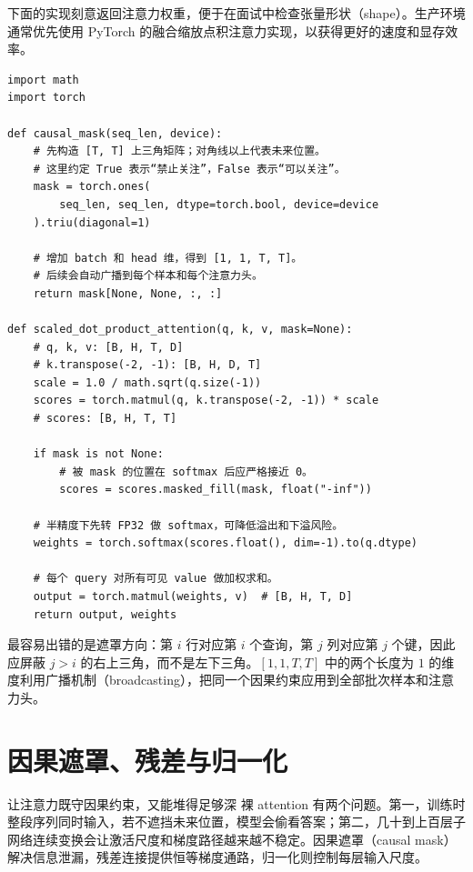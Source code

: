 
下面的实现刻意返回注意力权重，便于在面试中检查张量形状（shape）。生产环境通常优先使用 PyTorch 的融合缩放点积注意力实现，以获得更好的速度和显存效率。

\begin{lstlisting}
import math
import torch

def causal_mask(seq_len, device):
    # 先构造 [T, T] 上三角矩阵；对角线以上代表未来位置。
    # 这里约定 True 表示“禁止关注”，False 表示“可以关注”。
    mask = torch.ones(
        seq_len, seq_len, dtype=torch.bool, device=device
    ).triu(diagonal=1)

    # 增加 batch 和 head 维，得到 [1, 1, T, T]。
    # 后续会自动广播到每个样本和每个注意力头。
    return mask[None, None, :, :]

def scaled_dot_product_attention(q, k, v, mask=None):
    # q, k, v: [B, H, T, D]
    # k.transpose(-2, -1): [B, H, D, T]
    scale = 1.0 / math.sqrt(q.size(-1))
    scores = torch.matmul(q, k.transpose(-2, -1)) * scale
    # scores: [B, H, T, T]

    if mask is not None:
        # 被 mask 的位置在 softmax 后应严格接近 0。
        scores = scores.masked_fill(mask, float("-inf"))

    # 半精度下先转 FP32 做 softmax，可降低溢出和下溢风险。
    weights = torch.softmax(scores.float(), dim=-1).to(q.dtype)

    # 每个 query 对所有可见 value 做加权求和。
    output = torch.matmul(weights, v)  # [B, H, T, D]
    return output, weights
\end{lstlisting}

最容易出错的是遮罩方向：第 $i$ 行对应第 $i$ 个查询，第 $j$ 列对应第 $j$ 个键，因此应屏蔽 $j>i$ 的右上三角，而不是左下三角。$[1,1,T,T]$ 中的两个长度为 $1$ 的维度利用广播机制（broadcasting），把同一个因果约束应用到全部批次样本和注意力头。

\section{因果遮罩、残差与归一化}
\label{sec:residual}

\begin{motivationbox}{让注意力既守因果约束，又能堆得足够深}
裸 attention 有两个问题。第一，训练时整段序列同时输入，若不遮挡未来位置，模型会偷看答案；第二，几十到上百层子网络连续变换会让激活尺度和梯度路径越来越不稳定。因果遮罩（causal mask）解决信息泄漏，残差连接提供恒等梯度通路，归一化则控制每层输入尺度。
\end{motivationbox}

